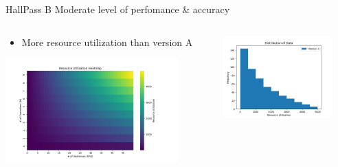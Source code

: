 \begin{frame}{HallPass B}
    Moderate level of perfomance \& accuracy
    \begin{columns}
        \begin{column}{0.5\textwidth}
            \begin{itemize}
                \item More resource utilization than version A
            \end{itemize}
            \centering
            \includegraphics[height=0.85\textheight,width=0.85\textwidth,keepaspectratio]{images/hallpass_b_util.png}
        \end{column}
        \begin{column}{0.6\textwidth}
            \centering
            \includegraphics[height=0.85\textheight,width=0.85\textwidth,keepaspectratio]{images/hallpass_b_hist.png}
        \end{column}
    \end{columns}            
\end{frame}

